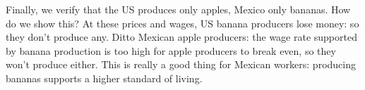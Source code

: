 \documentclass[letterpaper,12pt]{article}
\begin{document}
\begin{comment}
If we're wrong, we'll find out shortly. We'll guess the following
prices and show that they work: set $w = 1$ for the US and
\begin{eqnarray*}
    p_{a} &=& 0.05 \\
    p_{b} &=& ({4}/{3}) p_{a} \;=\; 0.0667 \\
    q &=& {4}/{3}
\end{eqnarray*}
for both countries (since there's trade, any other prices in
Mexico would lead to an arbitrage opportunity).  At these prices,
the US will produce $L_{1} \alpha = 100\times 20 = 2,000$ apples
and consume $a = {sY}/{p_{a}} = 1,500$ and $b =
{(1-s)Y}/{p_{b}} = 375$. The total level of utility is 1,061.

What about Mexico?  At these prices, Mexico produces only bananas,
as we guessed.  Total production is $L_{2}\beta = 500$ bananas.
The Mexican wage rate solves $p_{b}\beta = w$ or $w = 0.067\times
5 = 0.33$. (Why is the wage lower than in the US?  Because productivity
is lower.) Mexican income is therefore $Y = wN = 33.3$.
Consumption is $a = 500$ and $b = 125$. Utility is 353.6.



{\it The remainder of this section works through the
solution in greater detail.
It's only for people who want to see where all the pieces come from.
Strangely enough, there generally are some people like this,
but if you're not one of them go immediately to the next section.\/}

We can find the equilibrium by looking at the supply and demand
for apples.
We'll assume for now that the US produces only apples,
Mexico only bananas.
We'll verify this later.
If that's the case, then output of apples is the amount of labor in
the US times apple productivity:
\[
    \mbox{Supply of Apples}  \;=\;  L_1 \alpha_1
                \;=\; 100 \times 20 \;=\; 2000.
\]
What about demand?  We need demand by both countries.
Since each country spends a fraction $s$ on apples,
demand is
\[
    \mbox{Demand for Apples}  \;=\;  s Y_1/p_a + s Y_2/p_a .
\]
Note that US income is $ Y_1 = w_1 L_1 $.
\end{comment}



Finally, we verify that the US produces only apples, Mexico only
bananas.
How do we show this?
At these prices and wages,
US banana producers lose money:  so they don't produce any.
Ditto Mexican apple producers:  the wage rate supported by banana
production is too high for apple producers to break even,
so they won't produce either.
This is really a good thing for Mexican workers:
producing bananas supports a higher standard of living.
\end{document}
